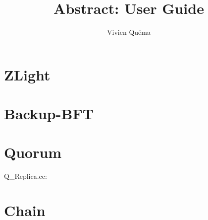 \documentclass[11pt]{article}
\begin{document}
\title{Abstract: User Guide}
\author{Vivien Qu\'ema}
\maketitle

\section{ZLight}
\section{Backup-BFT}
\section{Quorum}

Q\_Replica.cc: 

\section{Chain}
\end{document}
